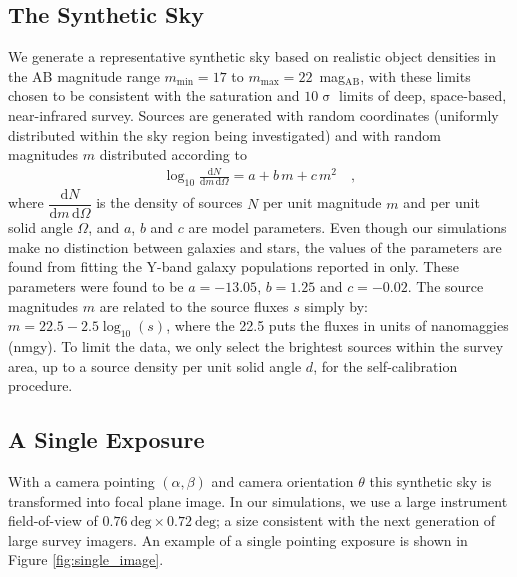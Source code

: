 \documentclass[manuscript]{aastex}
\newcommand{\dd}{\text{d}}
\begin{document}
\subsection{The Synthetic Sky}
We generate a representative synthetic sky based on realistic object densities in the AB magnitude range $m_\text{min} = 17$ to $m_\text{max} = 22$~mag$_\text{AB}$, with these limits chosen to be consistent with the saturation and $10\upsigma{}$ limits of deep, space-based, near-infrared survey. Sources are generated with random coordinates (uniformly distributed within the sky region being investigated) and with random magnitudes $m$ distributed according to
\begin{eqnarray}
\log_{10} \frac{\dd N}{\dd m \, \dd \Omega} = a + b\,m + c\,m^2 \label{eqn:power_law} \quad , 
\end{eqnarray}
where $\dfrac{\dd N}{\dd m \, \dd  \Omega}$  is the density of sources $N$ per unit magnitude $m$ and per unit solid angle $\Omega$, and $a$, $b$ and $c$ are model parameters. Even though our simulations make no distinction between galaxies and stars, the values of the parameters are found from fitting the Y-band galaxy populations reported in \citet{win11} only. These parameters were found to be $a = -13.05$, $b = 1.25$ and $c = -0.02$. The source magnitudes $m$ are related to the source fluxes $s$ simply by: $m = 22.5 - 2.5\log_{10}(s)$, where the 22.5 puts the fluxes in units of nanomaggies (nmgy). To limit the data, we only select the brightest sources within the survey area, up to a source density per unit solid angle $d$, for the self-calibration procedure.

\subsection{A Single Exposure}
\label{sec:single_exposure}
With a camera pointing $(\alpha, \beta)$ and camera orientation $\theta$ this synthetic sky is transformed into focal plane image. In our simulations, we use a large instrument field-of-view of $0.76~ \text{deg} \times 0.72~\text{deg}$; a size consistent with the next generation of large survey imagers. An example of a single pointing exposure is shown in Figure \ref{fig:single_image}.
\end{document}
